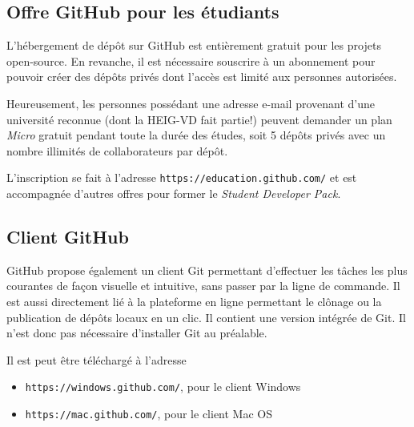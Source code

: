 \documentclass[11pt,a4paper]{article}
\begin{document}
\subsection{Offre GitHub pour les étudiants}

L'hébergement de dépôt sur GitHub est entièrement gratuit pour les projets open-source.
En revanche, il est nécessaire souscrire à un abonnement pour pouvoir créer des dépôts privés dont l'accès est limité aux personnes autorisées.

Heureusement, les personnes possédant une adresse e-mail provenant d'une université reconnue (dont la HEIG-VD fait partie!) peuvent demander un plan \textit{Micro} gratuit pendant toute la durée des études, soit 5 dépôts privés avec un nombre illimités de collaborateurs par dépôt.

L'inscription se fait à l'adresse {\tt https://education.github.com/} et est accompagnée d'autres offres pour former le {\it Student Developer Pack}.

\subsection{Client GitHub}

GitHub propose également un client Git permettant d'effectuer les tâches les plus courantes de façon visuelle et intuitive, sans passer par la ligne de commande.
Il est aussi directement lié à la plateforme en ligne permettant le clônage ou la publication de dépôts locaux en un clic.
Il contient une version intégrée de Git. Il n'est donc pas nécessaire d'installer Git au préalable.

Il est peut être téléchargé à l'adresse

\begin{itemize}
	\item {\tt https://windows.github.com/}, pour le client Windows
	\item {\tt https://mac.github.com/}, pour le client Mac OS
\end{itemize}
\end{document}
